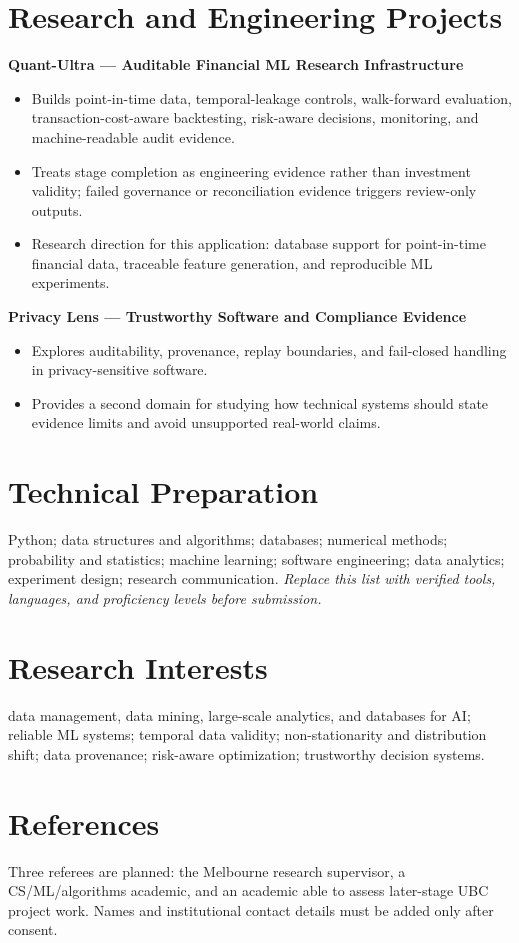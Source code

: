 \documentclass[11pt]{article}
\begin{document}
\section*{Research and Engineering Projects}
\textbf{Quant-Ultra --- Auditable Financial ML Research Infrastructure}
\begin{itemize}
\item Builds point-in-time data, temporal-leakage controls, walk-forward evaluation, transaction-cost-aware backtesting, risk-aware decisions, monitoring, and machine-readable audit evidence.
\item Treats stage completion as engineering evidence rather than investment validity; failed governance or reconciliation evidence triggers review-only outputs.
\item Research direction for this application: database support for point-in-time financial data, traceable feature generation, and reproducible ML experiments.
\end{itemize}

\begin{samepage}
\textbf{Privacy Lens --- Trustworthy Software and Compliance Evidence}
\begin{itemize}
\item Explores auditability, provenance, replay boundaries, and fail-closed handling in privacy-sensitive software.
\item Provides a second domain for studying how technical systems should state evidence limits and avoid unsupported real-world claims.
\end{itemize}
\end{samepage}

\section*{Technical Preparation}
Python; data structures and algorithms; databases; numerical methods; probability and statistics; machine learning; software engineering; data analytics; experiment design; research communication. \textit{Replace this list with verified tools, languages, and proficiency levels before submission.}

\section*{Research Interests}
data management, data mining, large-scale analytics, and databases for AI; reliable ML systems; temporal data validity; non-stationarity and distribution shift; data provenance; risk-aware optimization; trustworthy decision systems.

\section*{References}
Three referees are planned: the Melbourne research supervisor, a CS/ML/algorithms academic, and an academic able to assess later-stage UBC project work. Names and institutional contact details must be added only after consent.
\end{document}
